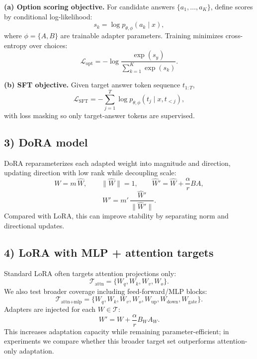 \documentclass{article}
\begin{document}
\textbf{(a) Option scoring objective.}
For candidate answers $\{a_1,\dots,a_{K}\}$, define scores by conditional log-likelihood:
\[
s_k = \log p_{\theta,\phi}(a_k \mid x),
\]
where $\phi=\{A,B\}$ are trainable adapter parameters. Training minimizes cross-entropy over choices:
\[
\mathcal{L}_{\text{opt}} = -\log \frac{\exp(s_{y})}{\sum_{k=1}^{K}\exp(s_k)}.
\]

\textbf{(b) SFT objective.}
Given target answer token sequence $t_{1:T}$,
\[
\mathcal{L}_{\text{SFT}} = -\sum_{j=1}^{T}\log p_{\theta,\phi}(t_j \mid x, t_{<j}),
\]
with loss masking so only target-answer tokens are supervised.

\subsection*{3) DoRA model}

DoRA reparameterizes each adapted weight into magnitude and direction, updating direction with low rank while decoupling scale:
\[
W = m \,\hat{W},\qquad \|\hat{W}\|=1,\qquad
\hat{W}' = \hat{W} + \frac{\alpha}{r}BA,
\]
\[
W' = m' \,\frac{\hat{W}'}{\|\hat{W}'\|}.
\]
Compared with LoRA, this can improve stability by separating norm and directional updates.

\subsection*{4) LoRA with MLP + attention targets}

Standard LoRA often targets attention projections only:
\[
\mathcal{T}_{\text{attn}}=\{W_q,W_k,W_v,W_o\}.
\]
We also test broader coverage including feed-forward/MLP blocks:
\[
\mathcal{T}_{\text{attn+mlp}}=\{W_q,W_k,W_v,W_o,W_{\text{up}},W_{\text{down}},W_{\text{gate}}\}.
\]
Adapters are injected for each $W\in\mathcal{T}$:
\[
W' = W + \frac{\alpha}{r}B_WA_W.
\]
This increases adaptation capacity while remaining parameter-efficient; in experiments we compare whether this broader target set outperforms attention-only adaptation.
\end{document}
